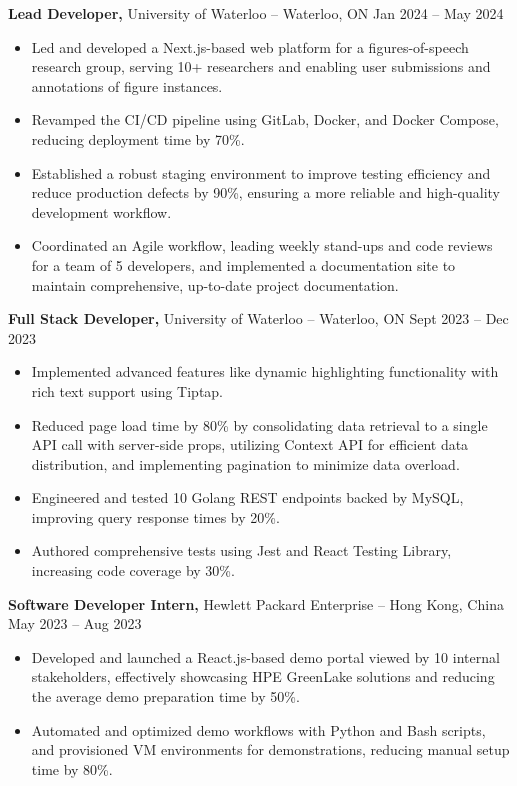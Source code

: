 \textbf{Lead Developer,} {University of Waterloo} -- Waterloo, ON \hfill Jan 2024 -- May 2024 \\
\vspace{-9pt}
\begin{itemize}
  \item Led and developed a Next.js-based web platform for a figures-of-speech research group, serving 10+ researchers and enabling user submissions and annotations of figure instances.
  \item Revamped the CI/CD pipeline using GitLab, Docker, and Docker Compose, reducing deployment time by 70\%.
  \item Established a robust staging environment to improve testing efficiency and reduce production defects by 90\%, ensuring a more reliable and high-quality development workflow.
  \item Coordinated an Agile workflow, leading weekly stand-ups and code reviews for a team of 5 developers, and implemented a documentation site to maintain comprehensive, up-to-date project documentation.
\end{itemize}

\textbf{Full Stack Developer,} {University of Waterloo} -- Waterloo, ON \hfill Sept 2023 -- Dec 2023 \\
\vspace{-9pt}
\begin{itemize}
  \item Implemented advanced features like dynamic highlighting functionality with rich text support using Tiptap.
  \item Reduced page load time by 80\% by consolidating data retrieval to a single API call with server-side props, utilizing Context API for efficient data distribution, and implementing pagination to minimize data overload.
  \item Engineered and tested 10 Golang REST endpoints backed by MySQL, improving query response times by 20\%.
  \item Authored comprehensive tests using Jest and React Testing Library, increasing code coverage by 30\%.
\end{itemize}

\textbf{Software Developer Intern,} {Hewlett Packard Enterprise} -- Hong Kong, China \hfill May 2023 -- Aug 2023 \\
\vspace{-9pt}
\begin{itemize}
  \item Developed and launched a React.js-based demo portal viewed by 10 internal stakeholders, effectively showcasing HPE GreenLake solutions and reducing the average demo preparation time by 50\%.
  \item Automated and optimized demo workflows with Python and Bash scripts, and provisioned VM environments for demonstrations, reducing manual setup time by 80\%.
\end{itemize}

